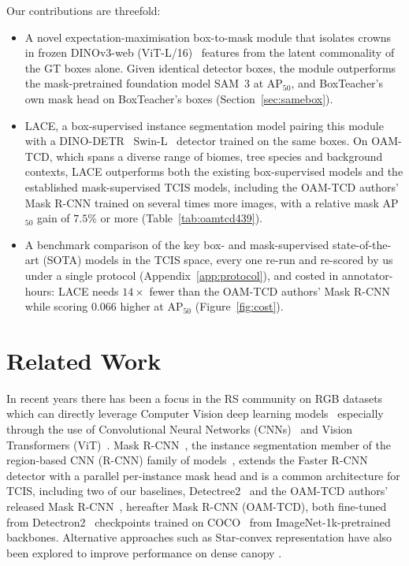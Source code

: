 \documentclass[remotesensing,article,submit,moreauthors]{Definitions/mdpi}
\begin{document}
Our contributions are threefold:
\begin{itemize}
\item A novel expectation-\hspace{0pt}maximisation box-to-mask module that isolates crowns in frozen DINOv3-web (ViT-L/16)~\cite{dinov3} features from the latent commonality of the GT boxes alone. Given identical detector boxes, the module outperforms the mask-pretrained foundation model SAM~3 at AP$_{50}$, and BoxTeacher's own mask head on BoxTeacher's boxes (Section~\ref{sec:samebox}).
\item LACE, a box-supervised instance segmentation model pairing this module with a DINO-DETR~\cite{dinodetr} Swin-L~\cite{swin} detector trained on the same boxes. On OAM-TCD, which spans a diverse range of biomes, tree species and background contexts, LACE outperforms both the existing box-supervised models and the established mask-supervised TCIS models, including the OAM-TCD authors' Mask R-CNN trained on several times more images, with a relative mask AP$_{50}$ gain of $7.5\%$ or more (Table~\ref{tab:oamtcd439}).
\item A benchmark comparison of the key box- and mask-supervised state-of-the-art (SOTA) models in the TCIS space, every one re-run and re-scored by us under a single protocol (Appendix~\ref{app:protocol}), and costed in annotator-hours: LACE needs $14\times$ fewer than the OAM-TCD authors' Mask R-CNN while scoring $0.066$ higher at AP$_{50}$ (Figure~\ref{fig:cost}).
\end{itemize}


\section{Related Work}

In recent years there has been a focus in the RS community on RGB datasets which can directly leverage Computer Vision deep learning models~\cite{zhu2017} especially through the use of Convolutional Neural Networks (CNNs)~\cite{lecun1998,alexnet} and Vision Transformers (ViT)~\cite{vit}. Mask R-CNN~\cite{maskrcnn}, the instance segmentation member of the region-based CNN (R-CNN) family of models~\cite{rcnn}, extends the Faster R-CNN~\cite{fasterrcnn} detector with a parallel per-instance mask head and is a common architecture for TCIS, including two of our baselines, Detectree2~\cite{ball2023} and the OAM-TCD authors' released Mask R-CNN~\cite{oamtcd}, hereafter Mask R-CNN (OAM-TCD), both fine-tuned from Detectron2~\cite{detectron2} checkpoints trained on COCO~\cite{coco} from ImageNet-1k-pretrained~\cite{imagenet} backbones. Alternative approaches such as Star-convex representation have also been explored to improve performance on dense canopy \cite{tong2025, fgtreeseg}.
\end{document}
